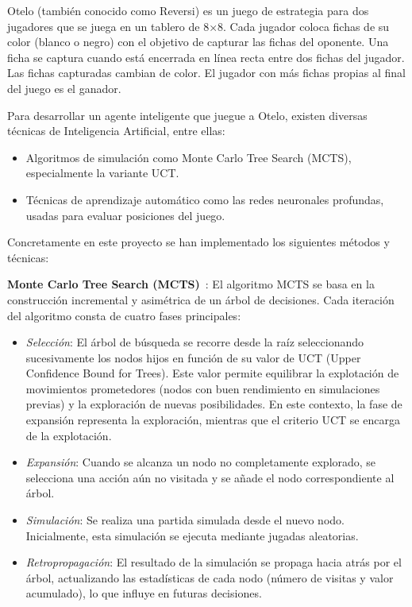 \documentclass[conference,a4paper]{IEEEtran}
\begin{document}
Otelo (también conocido como Reversi) es un juego de estrategia para dos jugadores que se juega en un tablero de 8×8. Cada jugador coloca fichas de su color (blanco o negro) con el objetivo de capturar las fichas del oponente. Una ficha se captura cuando está encerrada en línea recta entre dos fichas del jugador. Las fichas capturadas cambian de color. El jugador con más fichas propias al final del juego es el ganador.

Para desarrollar un agente inteligente que juegue a Otelo, existen diversas técnicas de Inteligencia Artificial, entre ellas:
\begin{itemize}
    \item Algoritmos de simulación como Monte Carlo Tree Search (MCTS), especialmente la variante UCT.
    \item Técnicas de aprendizaje automático como las redes neuronales profundas, usadas para evaluar posiciones del juego.
\end{itemize}

Concretamente en este proyecto se han implementado los siguientes métodos y técnicas:

\textbf{Monte Carlo Tree Search (MCTS)}~\cite{b4}: El algoritmo MCTS se basa en la construcción incremental y asimétrica de un árbol de decisiones. Cada iteración del algoritmo consta de cuatro fases principales:
\begin{itemize}
    \item \textit{Selección}: El árbol de búsqueda se recorre desde la raíz seleccionando sucesivamente los nodos hijos en función de su valor de UCT (Upper Confidence Bound for Trees). Este valor permite equilibrar la explotación de movimientos prometedores (nodos con buen rendimiento en simulaciones previas) y la exploración de nuevas posibilidades. En este contexto, la fase de expansión representa la exploración, mientras que el criterio UCT se encarga de la explotación.
    \item \textit{Expansión}: Cuando se alcanza un nodo no completamente explorado, se selecciona una acción aún no visitada y se añade el nodo correspondiente al árbol.
    \item \textit{Simulación}: Se realiza una partida simulada desde el nuevo nodo. Inicialmente, esta simulación se ejecuta mediante jugadas aleatorias.
    \item \textit{Retropropagación}: El resultado de la simulación se propaga hacia atrás por el árbol, actualizando las estadísticas de cada nodo (número de visitas y valor acumulado), lo que influye en futuras decisiones.
\end{itemize}
\end{document}
